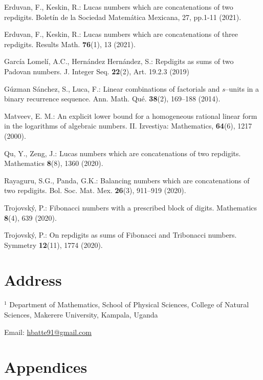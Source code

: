 \begin{thebibliography}{99}
	Erduvan, F., Keskin, R.: Lucas numbers which are concatenations of two repdigits. Boletín de la Sociedad Matemática Mexicana, 27, pp.1-11 (2021).
	
	Erduvan, F., Keskin, R.: Lucas numbers which are concatenations of three repdigits. Results Math. \textbf{76}(1), 13 (2021).
	
	García Lomelí, A.C., Hernández Hernández, S.: Repdigits as sums of two Padovan numbers. J. Integer Seq. \textbf{22}(2), Art. 19.2.3 (2019)
	
	Gúzman Sánchez, S., Luca, F.: Linear combinations of factorials and \( s \)--units in a binary recurrence sequence. Ann. Math. Qué. \textbf{38}(2), 169--188 (2014). 
		
	Matveev, E. M.: An explicit lower bound for a homogeneous rational linear form in the logarithms of algebraic numbers. II. Izvestiya: Mathematics, \textbf{64}(6), 1217  (2000).
	
	Qu, Y., Zeng, J.: Lucas numbers which are concatenations of two repdigits. Mathematics \textbf{8}(8), 1360 (2020).
	
	Rayaguru, S.G., Panda, G.K.: Balancing numbers which are concatenations of two repdigits. Bol. Soc. Mat. Mex. \textbf{26}(3), 911--919 (2020).
	
	Trojovský, P.: Fibonacci numbers with a prescribed block of digits. Mathematics \textbf{8}(4), 639 (2020).
	
	Trojovský, P.: On repdigits as sums of Fibonacci and Tribonacci numbers. Symmetry \textbf{12}(11), 1774 (2020). 
		
\end{thebibliography}



\section*{Address}
$ ^{1} $ Department of Mathematics, School of Physical Sciences, College of Natural Sciences, Makerere University, Kampala, Uganda

Email: \url{hbatte91@gmail.com}
\pagebreak
\section*{Appendices}
